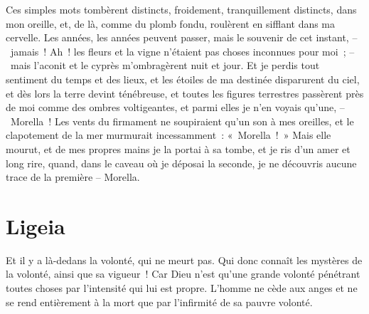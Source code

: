 \documentclass[french,twoside]{book} %
\begin{document}
Ces simples mots tombèrent distincts, froidement, tranquillement distincts, dans mon oreille, et, de là, comme du plomb fondu, roulèrent en sifflant dans ma cervelle. Les années, les années peuvent passer, mais le souvenir de cet instant, – jamais ! Ah ! les fleurs et la vigne n’étaient pas choses inconnues pour moi ; – mais l’aconit et le cyprès m’ombragèrent nuit et jour. Et je perdis tout sentiment du temps et des lieux, et les étoiles de ma destinée disparurent du ciel, et dès lors la terre devint ténébreuse, et toutes les figures terrestres passèrent près de moi comme des ombres voltigeantes, et parmi elles je n’en voyais qu’une, – Morella ! Les vents du firmament ne soupiraient qu’un son à mes oreilles, et le clapotement de la mer murmurait incessamment : « Morella ! » Mais elle mourut, et de mes propres mains je la portai à sa tombe, et je ris d’un amer et long rire, quand, dans le caveau où je déposai la seconde, je ne découvris aucune trace de la première – Morella.
\section[{Ligeia}]{Ligeia}\renewcommand{\leftmark}{Ligeia}

\noindent Et il y a là-dedans la volonté, qui ne meurt pas. Qui donc connaît les mystères de la volonté, ainsi que sa vigueur ! Car Dieu n’est qu’une grande volonté pénétrant toutes choses par l’intensité qui lui est propre. L’homme ne cède aux anges et ne se rend entièrement à la mort que par l’infirmité de sa pauvre volonté.\par
\end{document}
